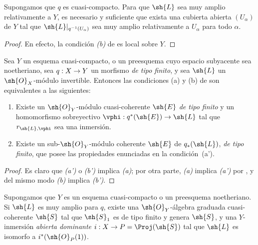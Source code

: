 \documentclass[oneside,10pt]{amsart}
\makeatletter
\newcommand{\ega@arrow}[2]{\mathchoice{#1}{#2}{#2}{#2}}
\renewcommand{\to}{\ega@arrow{\longrightarrow}{\rightarrow}}
\let\EGAOriginalLabel\label
\renewcommand{\label}[1]{\phantomsection\EGAOriginalLabel{#1}}
\makeatother
\begin{document}
\begin{corollary}[4.4.5]
\label{II.4.4.5}
Supongamos que $q$ es cuasi-compacto.
Para que $\sh{L}$ sea muy amplio relativamente a $Y$, es necesario y suficiente que exista una cubierta abierta $(U_\alpha)$ de $Y$ tal que $\sh{L}|_{q^{-1}(U_\alpha)}$ sea muy amplio relativamente a $U_\alpha$ para todo $\alpha$.
\end{corollary}

\begin{proof}
En efecto, la condición \emph{(b)} de  es local sobre $Y$.
\end{proof}

\begin{proposition}[4.4.6]
\label{II.4.4.6}
Sea $Y$ un esquema cuasi-compacto, o un preesquema cuyo espacio subyacente sea noetheriano, sea $q:X\to Y$ un morfismo \emph{de tipo finito}, y sea $\sh{L}$ un $\sh{O}_X$-módulo invertible.
Entonces las condiciones \textup{(a)} y \textup{(b)} de  son equivalentes a las siguientes:
\begin{enumerate}
  \item[\rm{(a')}] Existe un $\sh{O}_Y$-módulo cuasi-coherente $\sh{E}$ \emph{de tipo finito} y un homomorfismo sobreyectivo $\vphi:q^*(\sh{E})\to\sh{L}$ tal que $r_{\sh{L},\vphi}$ sea una inmersión.
  \item[\rm{(b')}] Existe un sub-$\sh{O}_Y$-módulo coherente $\sh{E}$ de $q_*(\sh{L})$, \emph{de tipo finito}, que posee las propiedades enunciadas en la condición~\textup{(a')}.
\end{enumerate}
\end{proposition}

\begin{proof}
Es claro que \emph{(a')} o \emph{(b')} implica \emph{(a)};
por otra parte, \emph{(a)} implica \emph{(a')} por , y del mismo modo \emph{(b)} implica \emph{(b')}.
\end{proof}

\begin{corollary}[4.4.7]
\label{II.4.4.7}
Supongamos que $Y$ es un esquema cuasi-compacto o un preesquema noetheriano.
Si $\sh{L}$ es muy amplio para $q$, existe una $\sh{O}_Y$-álgebra graduada cuasi-coherente $\sh{S}$ tal que $\sh{S}_1$ es de tipo finito y genera $\sh{S}$, y una $Y$-inmersión \emph{abierta dominante} $i:X\to P=\Proj(\sh{S})$ tal que $\sh{L}$ es isomorfo a $i^*(\sh{O}_P(1))$.
\end{corollary}
\end{document}
